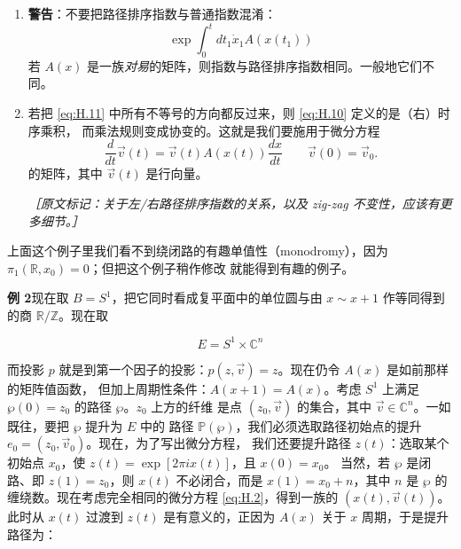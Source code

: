 \begin{enumerate}
  \item \textbf{警告}：不要把路径排序指数与普通指数混淆：
    \begin{equation}
      \exp\int_0^t dt_1\dot{x}_1 A(x(t_1))
      \tag{H.14}
      \label{eq:H.14}
    \end{equation}
    若 $A(x)$ 是一族\emph{对易}的矩阵，则指数与路径排序指数相同。一般地它们不同。

  \item 若把 \eqref{eq:H.11} 中所有不等号的方向都反过来，则 \eqref{eq:H.10} 定义的是（右）时序乘积，
    而乘法规则变成协变的。这就是我们要施用于微分方程
    \begin{equation}
      \frac{d}{dt}\vec{v}(t) = \vec{v}(t) A(x(t))\frac{dx}{dt}
      \qquad \vec{v}(0)=\vec{v}_0.
      \tag{H.15}
      \label{eq:H.15}
    \end{equation}
    的矩阵，其中 $\vec{v}(t)$ 是行向量。


    {\small\itshape ［原文标记：关于左/右路径排序指数的关系，以及 zig-zag 不变性，应该有更多细节。］}

\end{enumerate}

上面这个例子里我们看不到绕闭路的有趣单值性（monodromy），因为 $\pi_1(\mathbb{R},x_0)=0$；但把这个例子稍作修改
就能得到有趣的例子。

\textbf{例 2}\quad 现在取 $B=S^1$，把它同时看成复平面中的单位圆与由 $x\sim x+1$ 作等同得到的商
$\mathbb{R}/\mathbb{Z}$。现在取

\begin{equation}
  E = S^1\times\mathbb{C}^n
  \tag{H.16}
  \label{eq:H.16}
\end{equation}

而投影 $p$ 就是到第一个因子的投影：$p(z,\vec{v})=z$。现在仍令 $A(x)$ 是如前那样的矩阵值函数，
但加上周期性条件：$A(x+1)=A(x)$。考虑 $S^1$ 上满足 $\wp(0)=z_0$ 的路径 $\wp$。$z_0$ 上方的纤维
是点 $(z_0,\vec{v})$ 的集合，其中 $\vec{v}\in\mathbb{C}^n$。一如既往，要把 $\wp$ 提升为 $E$ 中的
路径 $\mathbb{P}(\wp)$，我们必须选取路径初始点的提升 $e_0=(z_0,\vec{v}_0)$。现在，为了写出微分方程，
我们还要提升路径 $z(t)$：选取某个初始点 $x_0$，使 $z(t)=\exp[2\pi i x(t)]$，且 $x(0)=x_0$。
当然，若 $\wp$ 是闭路、即 $z(1)=z_0$，则 $x(t)$ 不必闭合，而是 $x(1)=x_0+n$，其中 $n$ 是 $\wp$
的缠绕数。现在考虑完全相同的微分方程 \eqref{eq:H.2}，得到一族的 $(x(t),\vec{v}(t))$。此时从 $x(t)$ 过渡到
$z(t)$ 是有意义的，正因为 $A(x)$ 关于 $x$ 周期，于是提升路径为：

